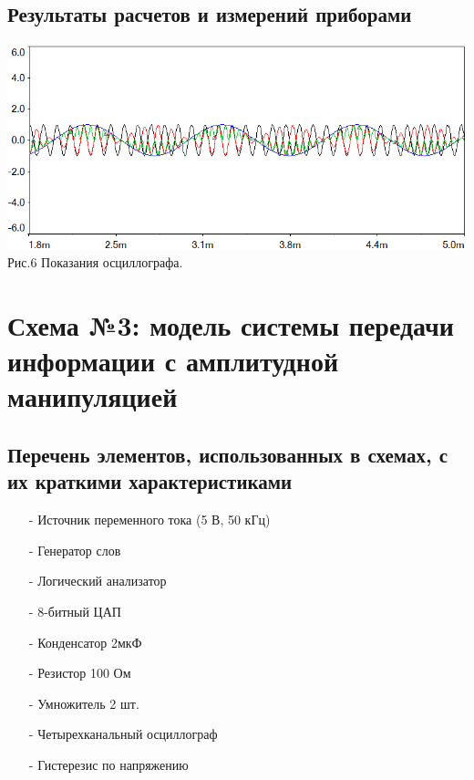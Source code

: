 \documentclass[11pt]{article}
\begin{document}
\subsection{Результаты расчетов и измерений приборами}
\begin{center}
    \includegraphics[width=1\linewidth]{img/second1.png}
        Рис.6 Показания осциллографа.
\end{center}
 
\newpage
\section{ Схема №3: модель системы передачи информации с амплитудной манипуляцией}
\subsection{Перечень элементов, использованных в схемах, с
их краткими характеристиками}
\begin{itemize}    
    \item[-] Источник переменного тока (5 В, 50 кГц)
    \item[-] Генератор слов
    \item[-] Логический анализатор
    \item[-] 8-битный ЦАП
    \item[-] Конденсатор 2мкФ
    \item[-] Резистор 100 Ом
    \item[-] Умножитель 2 шт.    
    \item[-] Четырехканальный осциллограф
    \item[-] Гистерезис по напряжению
\end{itemize}
\end{document}
